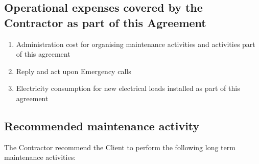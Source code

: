 \begin{center}
\end{center}

\subsection{Operational expenses covered by the Contractor as part of this Agreement}
\begin{enumerate}
	\item Administration cost for organising maintenance activities and activities part of this agreement
	\item Reply and act upon Emergency calls
	\item Electricity consumption for new electrical loads installed as part of this agreement
\end{enumerate}


\subsection{Recommended maintenance activity}

The Contractor recommend the Client to perform the following long term
maintenance activities:


\begin{center}
\end{center}
